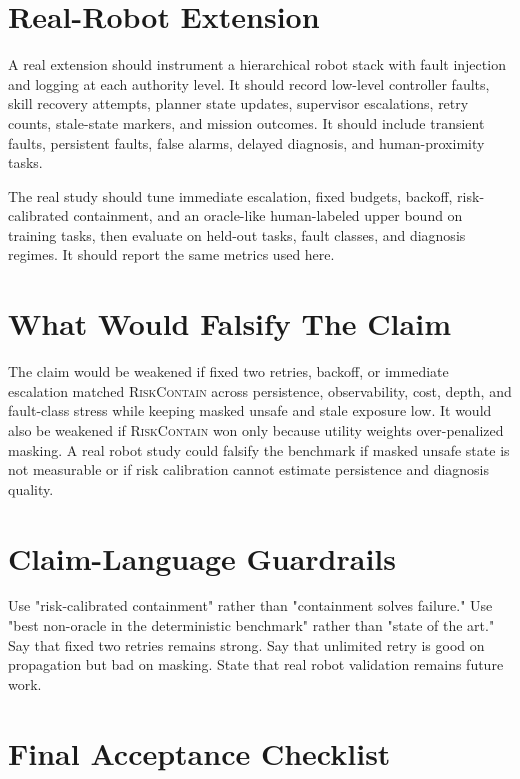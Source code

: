 \documentclass{article}
\newcommand{\method}{\textsc{RiskContain}\xspace}
\begin{document}
\section{Real-Robot Extension}

A real extension should instrument a hierarchical robot stack with fault injection and logging at each authority level. It should record low-level controller faults, skill recovery attempts, planner state updates, supervisor escalations, retry counts, stale-state markers, and mission outcomes. It should include transient faults, persistent faults, false alarms, delayed diagnosis, and human-proximity tasks.

The real study should tune immediate escalation, fixed budgets, backoff, risk-calibrated containment, and an oracle-like human-labeled upper bound on training tasks, then evaluate on held-out tasks, fault classes, and diagnosis regimes. It should report the same metrics used here.

\section{What Would Falsify The Claim}

The claim would be weakened if fixed two retries, backoff, or immediate escalation matched \method across persistence, observability, cost, depth, and fault-class stress while keeping masked unsafe and stale exposure low. It would also be weakened if \method won only because utility weights over-penalized masking. A real robot study could falsify the benchmark if masked unsafe state is not measurable or if risk calibration cannot estimate persistence and diagnosis quality.

\section{Claim-Language Guardrails}

Use "risk-calibrated containment" rather than "containment solves failure." Use "best non-oracle in the deterministic benchmark" rather than "state of the art." Say that fixed two retries remains strong. Say that unlimited retry is good on propagation but bad on masking. State that real robot validation remains future work.

\section{Final Acceptance Checklist}
\end{document}
